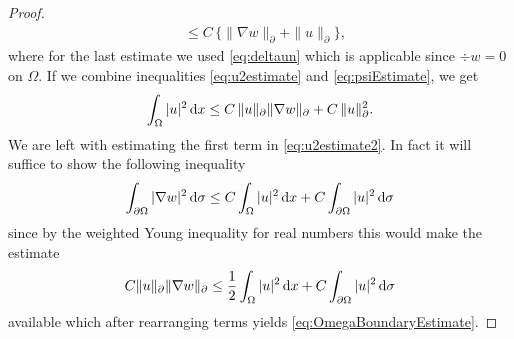 \begin{proof}
\begin{align}
    &\leq C \, \big\{ \|  \nabla w\|_\partial + \|u\|_\partial  \big\}, \label{eq:psiEstimate}
  \end{align}
  where for the last estimate we used \eqref{eq:deltaun} which is applicable since $\div w = 0$ on $\Omega$.
  If we combine inequalities \eqref{eq:u2estimate} and \eqref{eq:psiEstimate}, we get
  \begin{align}
    \int_\Omega |u|^2 \, {\operatorname{d}\!{x}} \leq C\, \|u\|_\partial \|\nabla w \|_\partial + C\, \|u\|_\partial^2. \label{eq:u2estimate2}
  \end{align}
  We are left with estimating the first term in \eqref{eq:u2estimate2}.
  In fact it will suffice to show the following inequality
  \begin{align}
    \label{eq:w2estimate}
    \int_{\partial\Omega} |\nabla w|^2 \, {\operatorname{d}\!{\sigma}} \leq C \int_\Omega |u|^2 \, {\operatorname{d}\!{x}} + C \int_{\partial\Omega} |u|^2 \, {\operatorname{d}\!{\sigma}}
  \end{align}
  since by the weighted Young inequality for real numbers this would make the estimate
  \begin{align*}
    C \| u\|_\partial \|\nabla w\|_\partial \leq \frac{1}{2} \int_\Omega |u|^2 \, {\operatorname{d}\!{x}} + C \int_{\partial\Omega} |u|^2 \, {\operatorname{d}\!{\sigma}}
  \end{align*}
  available which after rearranging terms yields \eqref{eq:OmegaBoundaryEstimate}.


\end{proof}
